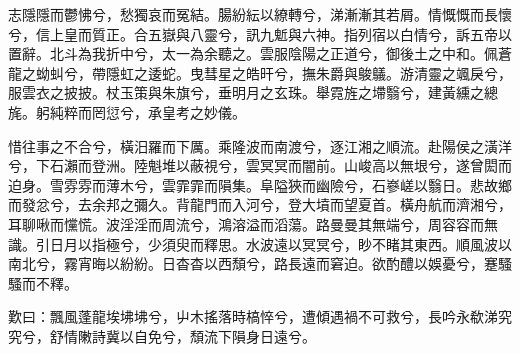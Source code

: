 
\begin{pinyinscope}
志隱隱而鬱怫兮，愁獨哀而冤結。腸紛紜以繚轉兮，涕漸漸其若屑。情慨慨而長懷兮，信上皇而質正。合五嶽與八靈兮，訊九鬿與六神。指列宿以白情兮，訴五帝以置辭。北斗為我折中兮，太一為余聽之。雲服陰陽之正道兮，御後土之中和。佩蒼龍之蚴虯兮，帶隱虹之逶蛇。曳彗星之皓旰兮，撫朱爵與鵔鸃。游清靈之颯戾兮，服雲衣之披披。杖玉策與朱旗兮，垂明月之玄珠。舉霓旌之墆翳兮，建黃纁之總旄。躬純粹而罔愆兮，承皇考之妙儀。

惜往事之不合兮，橫汨羅而下厲。乘隆波而南渡兮，逐江湘之順流。赴陽侯之潢洋兮，下石瀨而登洲。陸魁堆以蔽視兮，雲冥冥而闇前。山峻高以無垠兮，遂曾閎而迫身。雪雰雰而薄木兮，雲霏霏而隕集。阜隘狹而幽險兮，石嵾嵯以翳日。悲故鄉而發忿兮，去余邦之彌久。背龍門而入河兮，登大墳而望夏首。橫舟航而濟湘兮，耳聊啾而戃慌。波淫淫而周流兮，鴻溶溢而滔蕩。路曼曼其無端兮，周容容而無識。引日月以指極兮，少須臾而釋思。水波遠以冥冥兮，眇不睹其東西。順風波以南北兮，霧宵晦以紛紛。日杳杳以西頹兮，路長遠而窘迫。欲酌醴以娛憂兮，蹇騷騷而不釋。

歎曰：飄風蓬龍埃坲坲兮，屮木搖落時槁悴兮，遭傾遇禍不可救兮，長吟永欷涕究究兮，舒情敶詩冀以自免兮，頹流下隕身日遠兮。


\end{pinyinscope}